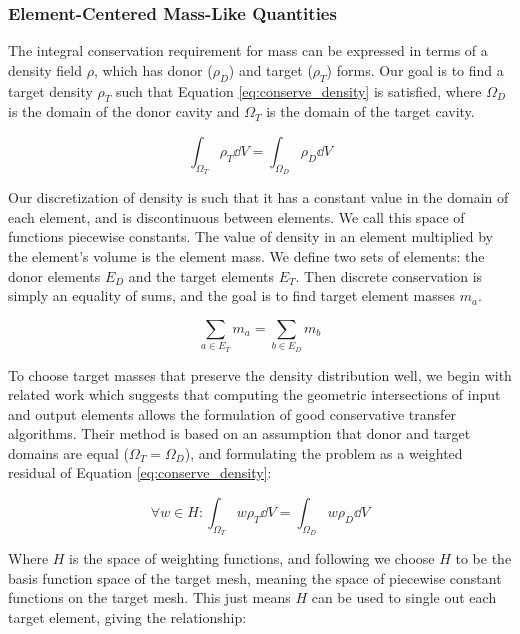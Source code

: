 \subsubsection{Element-Centered Mass-Like Quantities}
\label{sec:conserve_mass}

The integral conservation requirement for mass can be expressed
in terms of a density field $\rho$, which has donor ($\rho_D$)
and target ($\rho_T$) forms.
Our goal is to find a target density $\rho_T$ such that Equation
\ref{eq:conserve_density} is satisfied,
where $\Omega_D$ is the domain of the donor cavity and
$\Omega_T$ is the domain of the target cavity.

\begin{equation} \label{eq:conserve_density}
\int_{\Omega_T} \rho_T \dd V = \int_{\Omega_D} \rho_D \dd V
\end{equation}

Our discretization of density is such that it has a constant
value in the domain of each element, and is discontinuous between
elements.
We call this space of functions piecewise constants.
The value of density in an element multiplied by the element's
volume is the element mass.
We define two sets of elements: the donor elements $E_D$ and
the target elements $E_T$.
Then discrete conservation is simply an equality of sums,
and the goal is to find target element masses $m_a$.

\begin{equation}
\sum_{a \in E_T} m_a = \sum_{b \in E_D} m_b
\end{equation}

To choose target masses that preserve the density distribution well,
we begin with related work
\cite{jiao2004common,farrell2009conservative} which suggests that
computing the geometric intersections of input and output elements
allows the formulation of good conservative transfer algorithms.
Their method is based on an assumption that donor and target domains
are equal ($\Omega_T=\Omega_D$), and formulating the problem as a
weighted residual of Equation \ref{eq:conserve_density}:

\begin{equation}
\forall w \in H: \int_{\Omega_T} w \rho_T \dd V = \int_{\Omega_D} w \rho_D \dd V
\end{equation}

Where $H$ is the space of weighting functions, and following
\cite{jiao2004common} we choose $H$ to be the basis function space of the target mesh,
meaning the space of piecewise constant functions on the target mesh.
This just means $H$ can be used to single out each target element,
giving the relationship:

